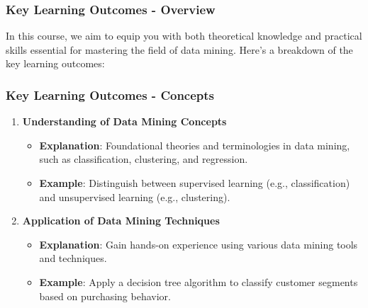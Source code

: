\documentclass[aspectratio=169]{beamer}
\begin{document}
\begin{frame}[fragile]
    \frametitle{Key Learning Outcomes - Overview}
    In this course, we aim to equip you with both theoretical knowledge and practical skills essential for mastering the field of data mining. Here’s a breakdown of the key learning outcomes:
\end{frame}

\begin{frame}[fragile]
    \frametitle{Key Learning Outcomes - Concepts}
    \begin{enumerate}
        \item \textbf{Understanding of Data Mining Concepts}  
          \begin{itemize}
              \item \textbf{Explanation}: Foundational theories and terminologies in data mining, such as classification, clustering, and regression.
              \item \textbf{Example}: Distinguish between supervised learning (e.g., classification) and unsupervised learning (e.g., clustering).
          \end{itemize}
          
        \item \textbf{Application of Data Mining Techniques}  
          \begin{itemize}
              \item \textbf{Explanation}: Gain hands-on experience using various data mining tools and techniques.
              \item \textbf{Example}: Apply a decision tree algorithm to classify customer segments based on purchasing behavior.
          \end{itemize}
    \end{enumerate}
\end{frame}
\end{document}
